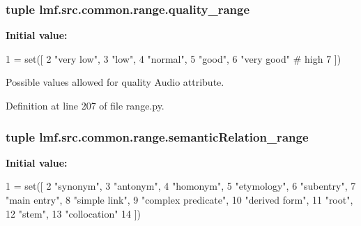 \hypertarget{namespacelmf_1_1src_1_1common_1_1range_a6aef6275dfffea6c0ebf4f105ae35b64}{
\subsubsection[{quality\+\_\+range}]{\setlength{\rightskip}{0pt plus 5cm}tuple lmf.\+src.\+common.\+range.\+quality\+\_\+range}}\label{namespacelmf_1_1src_1_1common_1_1range_a6aef6275dfffea6c0ebf4f105ae35b64}
{\bfseries Initial value\+:}
\begin{DoxyCode}
1 = set([
2     \textcolor{stringliteral}{"very low"},
3     \textcolor{stringliteral}{"low"},
4     \textcolor{stringliteral}{"normal"},
5     \textcolor{stringliteral}{"good"},
6     \textcolor{stringliteral}{"very good"} \textcolor{comment}{# high}
7 ])
\end{DoxyCode}


Possible values allowed for quality Audio attribute. 



Definition at line 207 of file range.\+py.

\hypertarget{namespacelmf_1_1src_1_1common_1_1range_abab5b7b201360f47699b34e9e685deb6}{
\subsubsection[{semantic\+Relation\+\_\+range}]{\setlength{\rightskip}{0pt plus 5cm}tuple lmf.\+src.\+common.\+range.\+semantic\+Relation\+\_\+range}}\label{namespacelmf_1_1src_1_1common_1_1range_abab5b7b201360f47699b34e9e685deb6}
{\bfseries Initial value\+:}
\begin{DoxyCode}
1 = set([
2     \textcolor{stringliteral}{"synonym"},
3     \textcolor{stringliteral}{"antonym"},
4     \textcolor{stringliteral}{"homonym"},
5     \textcolor{stringliteral}{"etymology"},
6     \textcolor{stringliteral}{"subentry"},
7     \textcolor{stringliteral}{"main entry"},
8     \textcolor{stringliteral}{"simple link"},
9     \textcolor{stringliteral}{"complex predicate"},
10     \textcolor{stringliteral}{"derived form"},
11     \textcolor{stringliteral}{"root"},
12     \textcolor{stringliteral}{"stem"},
13     \textcolor{stringliteral}{"collocation"}
14 ])
\end{DoxyCode}


